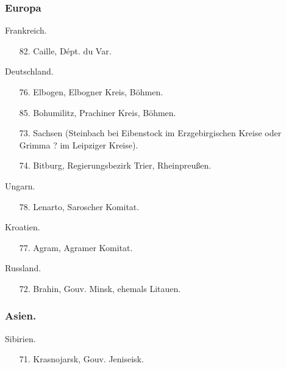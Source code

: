 \documentclass[a4paper, 11pt, oneside, polutonikogreek, german]{article}
\begin{document}
\subsubsection{Europa}
\begin{center}
Frankreich.
\end{center}
\begin{itemize}
    \small
    \item[82.] Caille, Dépt. du Var.
\end{itemize}
\begin{center}
Deutschland.
\end{center}
\begin{itemize}
    \small
    \item[76.] Elbogen, Elbogner Kreis, Böhmen.
    \item[85.] Bohumilitz, Prachiner Kreis, Böhmen.
    \item[73.] Sachsen (Steinbach bei Eibenstock im Erzgebirgischen Kreise oder Grimma ? im Leipziger Kreise).
    \item[74.] Bitburg, Regierungsbezirk Trier, Rheinpreußen.
\end{itemize}
\begin{center}
Ungarn.
\end{center}
\begin{itemize}
    \small
    \item[78.] Lenarto, Saroscher Komitat.
\end{itemize}
\begin{center}
Kroatien.
\end{center}
\begin{itemize}
    \small
    \item[77.] Agram, Agramer Komitat.
\end{itemize}
\begin{center}
Russland.
\end{center}
\begin{itemize}
    \small
    \item[72.] Brahin, Gouv. Minsk, ehemals Litauen.
\end{itemize}
\subsubsection{Asien.}
\begin{center}
Sibirien.
\end{center}
\begin{itemize}
    \small
    \item[71.] Krasnojarsk, Gouv. Jeniseisk.
\end{itemize}
\end{document}
